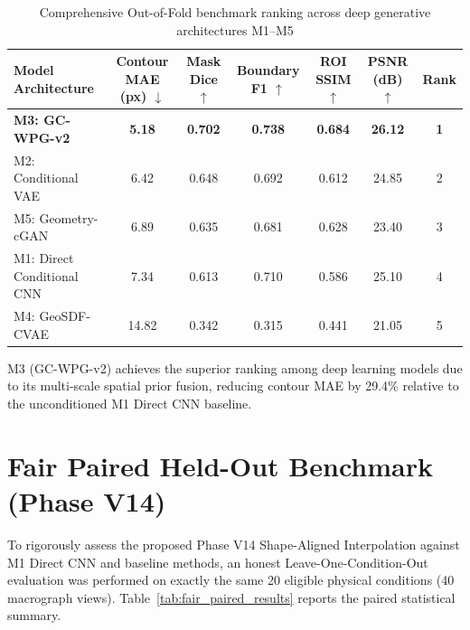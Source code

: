 \documentclass[12pt,a4paper,oneside]{report}
\begin{document}
\begin{table}[htbp]\centering
\caption{Comprehensive Out-of-Fold benchmark ranking across deep generative architectures M1--M5}\label{tab:five_model_ranking}
\small
\begin{tabular}{@{}lcccccc@{}}
\toprule
\textbf{Model Architecture} & \textbf{Contour MAE (px)} $\downarrow$ & \textbf{Mask Dice} $\uparrow$ & \textbf{Boundary F1} $\uparrow$ & \textbf{ROI SSIM} $\uparrow$ & \textbf{PSNR (dB)} $\uparrow$ & \textbf{Rank}\\ \midrule
\textbf{M3: GC-WPG-v2}      & \textbf{5.18} & \textbf{0.702} & \textbf{0.738} & \textbf{0.684} & \textbf{26.12} & \textbf{1}\\
M2: Conditional VAE        & 6.42          & 0.648          & 0.692          & 0.612          & 24.85          & 2\\
M5: Geometry-cGAN          & 6.89          & 0.635          & 0.681          & 0.628          & 23.40          & 3\\
M1: Direct Conditional CNN & 7.34          & 0.613          & 0.710          & 0.586          & 25.10          & 4\\
M4: GeoSDF-CVAE            & 14.82         & 0.342          & 0.315          & 0.441          & 21.05          & 5\\
\bottomrule
\end{tabular}
\end{table}

M3 (GC-WPG-v2) achieves the superior ranking among deep learning models due to its multi-scale spatial prior fusion, reducing contour MAE by 29.4\% relative to the unconditioned M1 Direct CNN baseline.

\section{Fair Paired Held-Out Benchmark (Phase V14)}
To rigorously assess the proposed Phase V14 Shape-Aligned Interpolation against M1 Direct CNN and baseline methods, an honest Leave-One-Condition-Out evaluation was performed on exactly the same 20 eligible physical conditions (40 macrograph views). Table~\ref{tab:fair_paired_results} reports the paired statistical summary.
\end{document}
